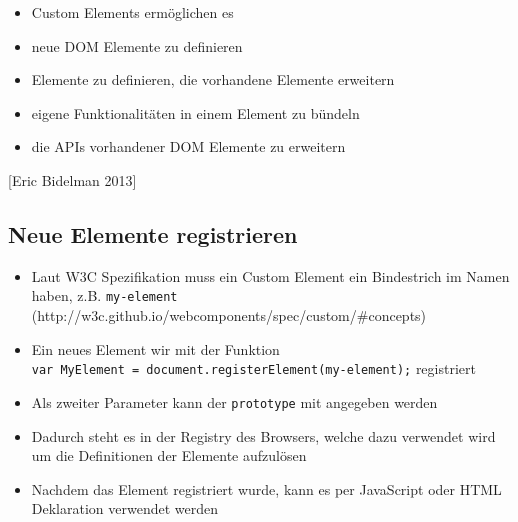 \begin{itemize}
\tightlist
\item
  Custom Elements ermöglichen es
\item
  neue DOM Elemente zu definieren
\item
  Elemente zu definieren, die vorhandene Elemente erweitern
\item
  eigene Funktionalitäten in einem Element zu bündeln
\item
  die APIs vorhandener DOM Elemente zu erweitern
\end{itemize}

{[}Eric Bidelman 2013{]}

\subsection{Neue Elemente
registrieren}\label{neue-elemente-registrieren}

\begin{itemize}
\item
  Laut W3C Spezifikation muss ein Custom Element ein Bindestrich im
  Namen haben, z.B. \texttt{my-element}
  (http://w3c.github.io/webcomponents/spec/custom/\#concepts)
\item
  Ein neues Element wir mit der Funktion
  \texttt{var\ MyElement\ =\ document.registerElement(\textquotesingle{}my-element\textquotesingle{});}
  registriert
\item
  Als zweiter Parameter kann der \texttt{prototype} mit angegeben werden

\begin{Shaded}
\begin{Highlighting}[]
 \OperatorTok{=} \NormalTok{(}\OperatorTok{,} \OperatorTok{\{}
  \OperatorTok{:} \NormalTok{(}\NormalTok{)}
\OperatorTok{\}}\NormalTok{)}\OperatorTok{;}
\end{Highlighting}
\end{Shaded}
\item
  Dadurch steht es in der Registry des Browsers, welche dazu verwendet
  wird um die Definitionen der Elemente aufzulösen
\item
  Nachdem das Element registriert wurde, kann es per JavaScript oder
  HTML Deklaration verwendet werden
\end{itemize}

